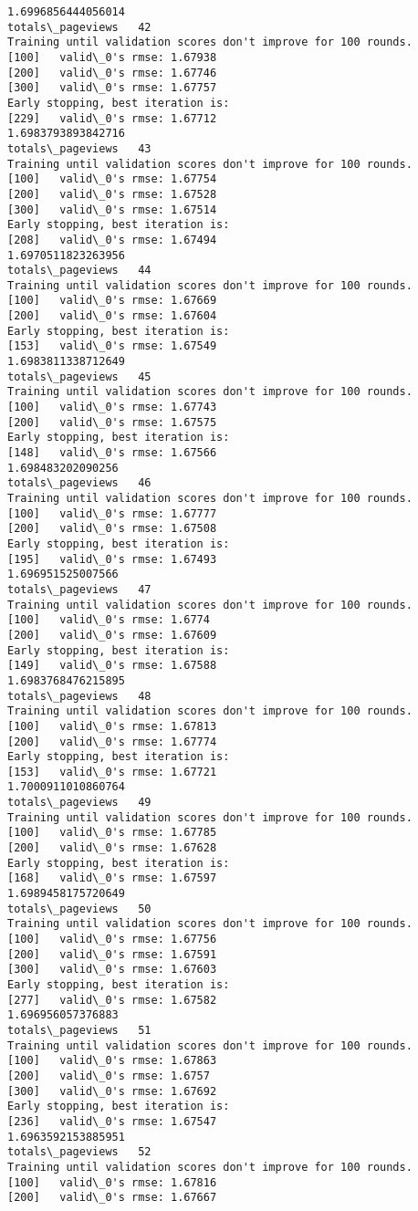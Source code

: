 \documentclass[11pt]{article}
\begin{document}
\begin{Verbatim}[commandchars=\\\{\}]
1.6996856444056014
totals\_pageviews   42
Training until validation scores don't improve for 100 rounds.
[100]	valid\_0's rmse: 1.67938
[200]	valid\_0's rmse: 1.67746
[300]	valid\_0's rmse: 1.67757
Early stopping, best iteration is:
[229]	valid\_0's rmse: 1.67712
1.6983793893842716
totals\_pageviews   43
Training until validation scores don't improve for 100 rounds.
[100]	valid\_0's rmse: 1.67754
[200]	valid\_0's rmse: 1.67528
[300]	valid\_0's rmse: 1.67514
Early stopping, best iteration is:
[208]	valid\_0's rmse: 1.67494
1.6970511823263956
totals\_pageviews   44
Training until validation scores don't improve for 100 rounds.
[100]	valid\_0's rmse: 1.67669
[200]	valid\_0's rmse: 1.67604
Early stopping, best iteration is:
[153]	valid\_0's rmse: 1.67549
1.6983811338712649
totals\_pageviews   45
Training until validation scores don't improve for 100 rounds.
[100]	valid\_0's rmse: 1.67743
[200]	valid\_0's rmse: 1.67575
Early stopping, best iteration is:
[148]	valid\_0's rmse: 1.67566
1.698483202090256
totals\_pageviews   46
Training until validation scores don't improve for 100 rounds.
[100]	valid\_0's rmse: 1.67777
[200]	valid\_0's rmse: 1.67508
Early stopping, best iteration is:
[195]	valid\_0's rmse: 1.67493
1.696951525007566
totals\_pageviews   47
Training until validation scores don't improve for 100 rounds.
[100]	valid\_0's rmse: 1.6774
[200]	valid\_0's rmse: 1.67609
Early stopping, best iteration is:
[149]	valid\_0's rmse: 1.67588
1.6983768476215895
totals\_pageviews   48
Training until validation scores don't improve for 100 rounds.
[100]	valid\_0's rmse: 1.67813
[200]	valid\_0's rmse: 1.67774
Early stopping, best iteration is:
[153]	valid\_0's rmse: 1.67721
1.7000911010860764
totals\_pageviews   49
Training until validation scores don't improve for 100 rounds.
[100]	valid\_0's rmse: 1.67785
[200]	valid\_0's rmse: 1.67628
Early stopping, best iteration is:
[168]	valid\_0's rmse: 1.67597
1.6989458175720649
totals\_pageviews   50
Training until validation scores don't improve for 100 rounds.
[100]	valid\_0's rmse: 1.67756
[200]	valid\_0's rmse: 1.67591
[300]	valid\_0's rmse: 1.67603
Early stopping, best iteration is:
[277]	valid\_0's rmse: 1.67582
1.696956057376883
totals\_pageviews   51
Training until validation scores don't improve for 100 rounds.
[100]	valid\_0's rmse: 1.67863
[200]	valid\_0's rmse: 1.6757
[300]	valid\_0's rmse: 1.67692
Early stopping, best iteration is:
[236]	valid\_0's rmse: 1.67547
1.6963592153885951
totals\_pageviews   52
Training until validation scores don't improve for 100 rounds.
[100]	valid\_0's rmse: 1.67816
[200]	valid\_0's rmse: 1.67667

\end{Verbatim}
\end{document}
